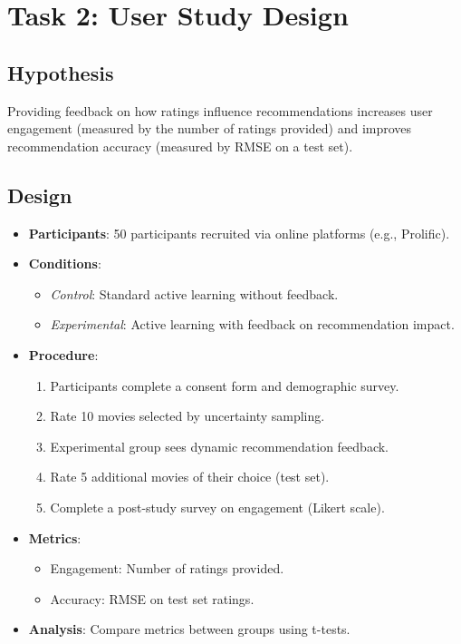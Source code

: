 \documentclass{article}
\begin{document}
\section{Task 2: User Study Design}
\subsection{Hypothesis}
Providing feedback on how ratings influence recommendations increases user engagement (measured by the number of ratings provided) and improves recommendation accuracy (measured by RMSE on a test set).

\subsection{Design}
\begin{itemize}
    \item \textbf{Participants}: 50 participants recruited via online platforms (e.g., Prolific).
    \item \textbf{Conditions}:
    \begin{itemize}
        \item \textit{Control}: Standard active learning without feedback.
        \item \textit{Experimental}: Active learning with feedback on recommendation impact.
    \end{itemize}
    \item \textbf{Procedure}:
    \begin{enumerate}
        \item Participants complete a consent form and demographic survey.
        \item Rate 10 movies selected by uncertainty sampling.
        \item Experimental group sees dynamic recommendation feedback.
        \item Rate 5 additional movies of their choice (test set).
        \item Complete a post-study survey on engagement (Likert scale).
    \end{enumerate}
    \item \textbf{Metrics}:
    \begin{itemize}
        \item Engagement: Number of ratings provided.
        \item Accuracy: RMSE on test set ratings.
    \end{itemize}
    \item \textbf{Analysis}: Compare metrics between groups using t-tests.
\end{itemize}
\end{document}
